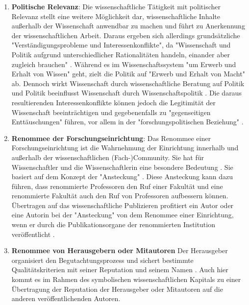 \begin{enumerate}
\item \textbf{Politische Relevanz}: Die wissenschaftliche Tätigkeit mit politischer Relevanz stellt eine weitere Möglichkeit dar, wissenschaftliche Inhalte außerhalb der Wissenschaft anwendbar zu machen und führt zu Anerkennung der wissenschaftlichen Arbeit. Daraus ergeben sich allerdings grundsätzliche "Verständigungsprobleme und Interessenkonflikte", da  "Wissenschaft und Politik aufgrund unterschiedlicher Rationalitäten handeln, einander aber zugleich brauchen" \cite{Mayntz_1996}. Während es im Wissenschaftssystem "um Erwerb und Erhalt von Wissen" geht, zielt die Politik auf "Erwerb und Erhalt von Macht" \cite{Mayntz_1996} ab. Dennoch wirkt Wissenschaft durch wissenschaftliche Beratung auf Politik und  Politik beeinflusst Wissenschaft durch Wissenschaftspolitik \cite[:10]{Brown_2014}. Die daraus resultierenden Interessenkonflikte können jedoch die Legitimität der Wissenschaft beeinträchtigen \cite{weingart_2005_wissenschaft} \cite[:494]{Weber_1992} und gegebenenfalls zu "gegenseitigen Enttäuschungen" führen, vor allem in der "forschungspolitischen Beziehung" \cite{Mayntz_1996}.
\item \textbf{Renommee der Forschungseinrichtung}: Das Renommee einer Forschungseinrichtung ist die Wahrnehmung der Einrichtung innerhalb und außerhalb der wissenschaftlichen (Fach-)Community. Sie hat für Wissenschaftler und die Wissenschaftlerin eine besondere Bedeutung \cite{mayntz_2008_wissensproduktion}. Sie basiert auf dem Konzept der "Ansteckung" \cite{luhmann_1970_selbststeuerung}. Diese Ansteckung kann dazu führen, dass renommierte Professoren den Ruf einer Fakultät und eine renommierte Fakultät auch den Ruf von Professoren aufbessern können. Übertragen auf das wissenschaftliche Publizieren profitiert ein Autor oder eine Autorin bei der "Ansteckung" von dem Renommee einer Einrichtung, wenn er durch die Publikationsorgane der renommierten Institution veröffentlicht \cite{lutz_2012_zugang}.
\item \textbf{Renommee von Herausgebern oder Mitautoren} Der Herausgeber organisiert den Begutachtungsprozess und sichert bestimmte Qualitätskriterien mit seiner Reputation und seinem Namen \cite{mueller_2009_peerreview}. Auch hier kommt es im Rahmen des symbolischen wissenschaftlichen Kapitals zu einer Übertragung der Reputation der Herausgeber oder Mitautoren auf die anderen veröffentlichenden Autoren.

\end{enumerate}
